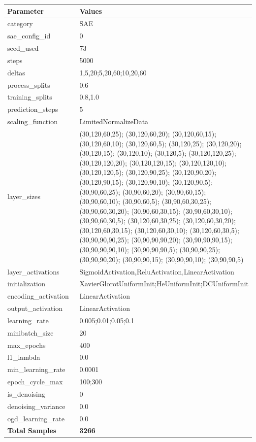 \documentclass[a4paper,11pt,oneside]{article}
\theoremstyle{plain}
\theoremstyle{definition}
\begin{document}
	\begin{longtable}[H]{|p{0.3\linewidth}|p{0.7\linewidth}|} \hline \textbf{Parameter} &\textbf{Values} \\\hline{category} & {SAE} \\\hline
		{sae\_config\_id} & {0} \\\hline
		{seed\_used} & {73} \\\hline
		{steps} & {5000} \\\hline
		{deltas} & {1,5,20;5,20,60;10,20,60} \\\hline
		{process\_splits} & {0.6} \\\hline
		{training\_splits} & {0.8,1.0} \\\hline
		{prediction\_steps} & {5} \\\hline
		{scaling\_function} & {LimitedNormalizeData} \\\hline
		{layer\_sizes} & {(30,120,60,25); (30,120,60,20); (30,120,60,15); (30,120,60,10); (30,120,60,5); (30,120,25); (30,120,20); (30,120,15); (30,120,10); (30,120,5); (30,120,120,25); (30,120,120,20); (30,120,120,15); (30,120,120,10); (30,120,120,5); (30,120,90,25); (30,120,90,20); (30,120,90,15); (30,120,90,10); (30,120,90,5); (30,90,60,25); (30,90,60,20); (30,90,60,15); (30,90,60,10); (30,90,60,5); (30,90,60,30,25); (30,90,60,30,20); (30,90,60,30,15); (30,90,60,30,10); (30,90,60,30,5); (30,120,60,30,25); (30,120,60,30,20); (30,120,60,30,15); (30,120,60,30,10); (30,120,60,30,5); (30,90,90,90,25); (30,90,90,90,20); (30,90,90,90,15); (30,90,90,90,10); (30,90,90,90,5); (30,90,90,25); (30,90,90,20); (30,90,90,15); (30,90,90,10); (30,90,90,5)} \\\hline
		{layer\_activations} & {SigmoidActivation,ReluActivation,LinearActivation} \\\hline
		{initialization} & {XavierGlorotUniformInit;HeUniformInit;DCUniformInit} \\\hline
		{encoding\_activation} & {LinearActivation} \\\hline
		{output\_activation} & {LinearActivation} \\\hline
		{learning\_rate} & {0.005;0.01;0.05;0.1} \\\hline
		{minibatch\_size} & {20} \\\hline
		{max\_epochs} & {400} \\\hline
		{l1\_lambda} & {0.0} \\\hline
		{min\_learning\_rate} & {0.0001} \\\hline
		{epoch\_cycle\_max} & {100;300} \\\hline
		{is\_denoising} & {0} \\\hline
		{denoising\_variance} & {0.0} \\\hline
		{ogd\_learning\_rate} & {0.0} \\\hline
		{\textbf{Total Samples}} & {\textbf{3266}} \\\hline
	\end{longtable}
\end{document}
